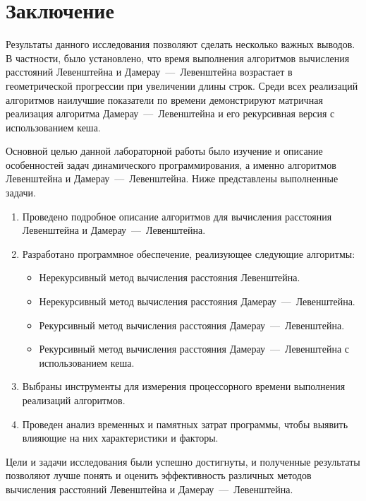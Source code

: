 \chapter*{Заключение}

Результаты данного исследования позволяют сделать несколько важных выводов. 
В частности, было установлено, что время выполнения алгоритмов вычисления расстояний Левенштейна и Дамерау~---~Левенштейна возрастает в геометрической прогрессии при увеличении длины строк. 
Среди всех реализаций алгоритмов наилучшие показатели по времени демонстрируют матричная реализация алгоритма Дамерау~---~Левенштейна и его рекурсивная версия с использованием кеша.

Основной целью данной лабораторной работы было изучение и описание особенностей задач динамического программирования, а именно алгоритмов Левенштейна и Дамерау~---~Левенштейна. 
Ниже представлены выполненные задачи.

\begin{enumerate}
\item Проведено подробное описание алгоритмов для вычисления расстояния Левенштейна и Дамерау~---~Левенштейна.
\item Разработано программное обеспечение, реализующее следующие алгоритмы:
\begin{itemize}[label=---]
\item Нерекурсивный метод вычисления расстояния Левенштейна.
\item Нерекурсивный метод вычисления расстояния Дамерау~---~Левенштейна.
\item Рекурсивный метод вычисления расстояния Дамерау~---~Левенштейна.
\item Рекурсивный метод вычисления расстояния Дамерау~---~Левенштейна с использованием кеша.
\end{itemize}
\item Выбраны инструменты для измерения процессорного времени выполнения реализаций алгоритмов.
\item Проведен анализ временных и памятных затрат программы, чтобы выявить влияющие на них характеристики и факторы.
\end{enumerate}

Цели и задачи исследования были успешно достигнуты, и полученные результаты позволяют лучше понять и оценить эффективность различных методов вычисления расстояний Левенштейна и Дамерау~---~Левенштейна.